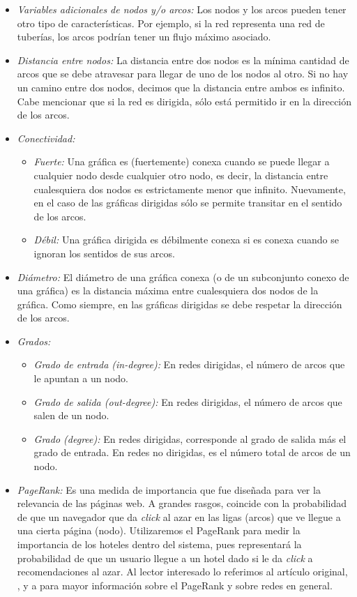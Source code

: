 \documentclass[12pt]{report}
\begin{document}
\begin{itemize}
	\item \emph{Variables adicionales de nodos y/o arcos:} Los nodos y los arcos pueden tener otro tipo de características. Por ejemplo, si la red representa una red de tuberías, los arcos podrían tener un flujo máximo asociado.
	\item \emph{Distancia entre nodos:} La distancia entre dos nodos es la mínima cantidad de arcos que se debe atravesar para llegar de uno de los nodos al otro. Si no hay un camino entre dos nodos, decimos que la distancia entre ambos es infinito. Cabe mencionar que si la red es dirigida, sólo está permitido ir en la dirección de los arcos.
	\item \emph{Conectividad:}
	\begin{itemize}
		\item \emph{Fuerte:} Una gráfica es (fuertemente) conexa cuando se puede llegar a cualquier nodo desde cualquier otro nodo, es decir, la distancia entre cualesquiera dos nodos es estrictamente menor que infinito. Nuevamente, en el caso de las gráficas dirigidas sólo se permite transitar en el sentido de los arcos.
		\item \emph{Débil:} Una gráfica dirigida es débilmente conexa si es conexa cuando se ignoran los sentidos de sus arcos.
	\end{itemize}
	\item \emph{Diámetro:} El diámetro de una gráfica conexa (o de un subconjunto conexo de una gráfica) es la distancia máxima entre cualesquiera dos nodos de la gráfica. Como siempre, en las gráficas dirigidas se debe respetar la dirección de los arcos.
	\item \emph{Grados:}
	\begin{itemize}
		\item \emph{Grado de entrada (in-degree):} En redes dirigidas, el número de arcos que le apuntan a un nodo.
		\item \emph{Grado de salida (out-degree):} En redes dirigidas, el número de arcos que salen de un nodo.
		\item \emph{Grado (degree):} En redes dirigidas, corresponde al grado de salida más el grado de entrada. En redes no dirigidas, es el número total de arcos de un nodo.
	\end{itemize}
	\item \emph{PageRank:} Es una medida de importancia que fue diseñada para ver la relevancia de las páginas web. A grandes rasgos, coincide con la probabilidad de que un navegador que da \emph{click} al azar en las ligas (arcos) que ve llegue a una cierta página (nodo). Utilizaremos el PageRank para medir la importancia de los hoteles dentro del sistema, pues representará la probabilidad de que un usuario llegue a un hotel dado si le da \emph{click} a recomendaciones al azar. Al lector interesado lo referimos al artículo original, \cite{pagerank}, y a \cite{mmds} para mayor información sobre el PageRank y sobre redes en general.
\end{itemize}
\end{document}
